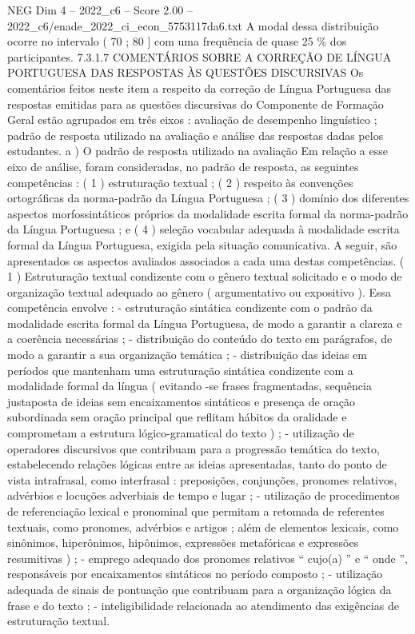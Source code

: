\begin{textsample}{NEG Dim 4 – 2022\_c6 – Score 2.00 – 2022\_c6/enade\_2022\_ci\_econ\_5753117da6.txt}
A modal dessa distribuição ocorre no intervalo ( 70 ; 80 ] com uma frequência de quase 25 \% dos participantes. 7.3.1.7 COMENTÁRIOS SOBRE A CORREÇÃO DE LÍNGUA PORTUGUESA DAS RESPOSTAS ÀS QUESTÕES DISCURSIVAS Os comentários feitos neste item a respeito da correção de Língua Portuguesa das respostas emitidas para as questões discursivas do Componente de Formação Geral estão agrupados em três eixos : avaliação de desempenho linguístico ; padrão de resposta utilizado na avaliação e análise das respostas dadas pelos estudantes. a ) O padrão de resposta utilizado na avaliação Em relação a esse eixo de análise, foram consideradas, no padrão de resposta, as seguintes competências : ( 1 ) estruturação textual ; ( 2 ) respeito às convenções ortográficas da norma-padrão da Língua Portuguesa ; ( 3 ) domínio dos diferentes aspectos morfossintáticos próprios da modalidade escrita formal da norma-padrão da Língua Portuguesa ; e ( 4 ) seleção vocabular adequada à modalidade escrita formal da Língua Portuguesa, exigida pela situação comunicativa.
A seguir, são apresentados os aspectos avaliados associados a cada uma destas competências. ( 1 ) Estruturação textual condizente com o gênero textual solicitado e o modo de organização textual adequado ao gênero ( argumentativo ou expositivo ).
Essa competência envolve : - estruturação sintática condizente com o padrão da modalidade escrita formal da Língua Portuguesa, de modo a garantir a clareza e a coerência necessárias ; - distribuição do conteúdo do texto em parágrafos, de modo a garantir a sua organização temática ; - distribuição das ideias em períodos que mantenham uma estruturação sintática condizente com a modalidade formal da língua ( evitando -se frases fragmentadas, sequência justaposta de ideias sem encaixamentos sintáticos e presença de oração subordinada sem oração principal que reflitam hábitos da oralidade e comprometam a estrutura lógico-gramatical do texto ) ; - utilização de operadores discursivos que contribuam para a progressão temática do texto, estabelecendo relações lógicas entre as ideias apresentadas, tanto do ponto de vista intrafrasal, como interfrasal : preposições, conjunções, pronomes relativos, advérbios e locuções adverbiais de tempo e lugar ; - utilização de procedimentos de referenciação lexical e pronominal que permitam a retomada de referentes textuais, como pronomes, advérbios e artigos ; além de elementos lexicais, como sinônimos, hiperônimos, hipônimos, expressões metafóricas e expressões resumitivas ) ; - emprego adequado dos pronomes relativos “ cujo(a) ” e “ onde ”, responsáveis por encaixamentos sintáticos no período composto ; - utilização adequada de sinais de pontuação que contribuam para a organização lógica da frase e do texto ; - inteligibilidade relacionada ao atendimento das exigências de estruturação textual.

\end{textsample}
